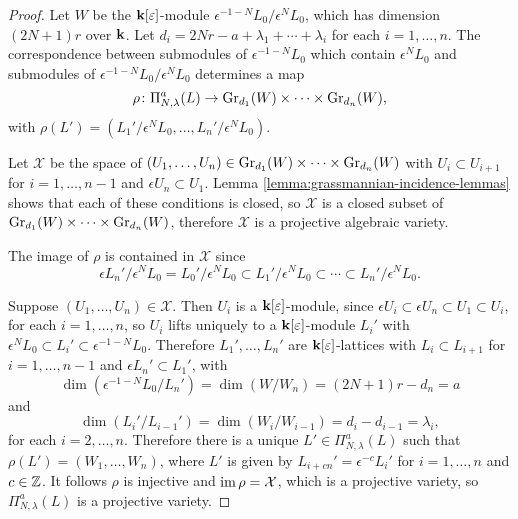 \documentclass[a4paper, 11pt]{report}
\begin{document}
\begin{proof}
Let $W$ be the $\field[\epsilon]$-module $\epsilon^{-1-N}L_0/{\epsilon^N L_0}$, which has dimension $(2N+1)r$ over $\field$. Let $d_i = 2Nr -a +\lambda_1 +\cdots +\lambda_i$ for each $i=1,\ldots, n$. The correspondence between submodules of $\epsilon^{-1-N}L_0$ which contain $\epsilon^N L_0$ and submodules of $\epsilon^{-1-N}L_0/{\epsilon^N L_0}$ determines a map
\begin{equation*}
\rho\colon\Pi_{N,\lambda}^a(L)\to\GR[d_1]{W}\times\cdots\times\GR[d_n]{W},
\end{equation*}
with $\rho(L')=(L_1'/{\epsilon^N L_0},\ldots,L_n'/{\epsilon^N L_0})$.

Let $\mathcal{X}$ be the space of $(U_1,\ldots, U_n)\in\GR[d_1]{W}\times\cdots\times\GR[d_n]{W}$ with $U_i\subset U_{i+1}$ for $i=1,\ldots,n-1$ and $\epsilon U_n\subset U_1$. Lemma \ref{lemma:grassmannian-incidence-lemmas} shows that each of these conditions is closed, so $\mathcal{X}$ is a closed subset of $\GR[d_1]{W}\times\cdots\times\GR[d_n]{W}$, therefore $\mathcal{X}$ is a projective algebraic variety.

The image of $\rho$ is contained in $\mathcal{X}$ since
\begin{equation*}
\epsilon L_n'/{\epsilon^N L_0} = L_0'/{\epsilon^N L_0} \subset L_1'/{\epsilon^N L_0}\subset\cdots\subset L_n'/{\epsilon^N L_0}.
\end{equation*}

Suppose $(U_1,\ldots,U_n)\in\mathcal{X}$. Then $U_i$ is a $\field[\epsilon]$-module, since $\epsilon U_i\subset \epsilon U_n\subset U_1\subset U_i$, for each $i=1,\ldots,n$, so $U_i$ lifts uniquely to a $\field[\epsilon]$-module $L_i'$ with $\epsilon^N L_0\subset L_i'\subset\epsilon^{-1-N}L_0$. Therefore $L_1',\ldots,L_n'$ are $\field[\epsilon]$-lattices with $L_i\subset L_{i+1}$ for $i=1,\ldots,n-1$ and $\epsilon L_n'\subset L_1'$, with
\begin{equation*}
\dim\left(\epsilon^{-1-N}L_0/{L_n'}\right) = \dim\left(W/{W_n}\right) = (2N+1)r - d_n = a
\end{equation*}
and
\begin{equation*}
\dim\left(L_i'/{L_{i-1}'}\right) = \dim\left(W_i/{W_{i-1}}\right) = d_i - d_{i-1} = \lambda_i,
\end{equation*}
for each $i=2,\ldots,n$. Therefore there is a unique $L'\in\Pi_{N,\lambda}^a(L)$ such that $\rho(L')=(W_1,\ldots, W_n)$, where $L'$ is given by $L_{i+cn}'=\epsilon^{-c}L_i'$ for $i=1,\ldots,n$ and $c\in\integers$. It follows $\rho$ is injective and $\IM{\rho}=\mathcal{X}$, which is a projective variety, so $\Pi_{N,\lambda}^a(L)$ is a projective variety.
\end{proof}
\end{document}
